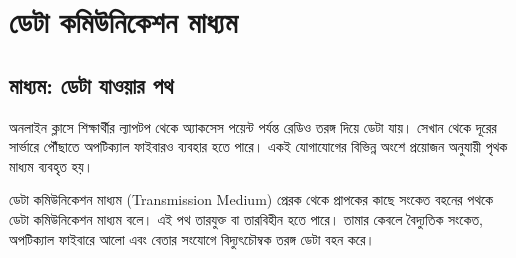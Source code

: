 \begingroup
\chTwoReadableTopicStyle
\section{ডেটা কমিউনিকেশন মাধ্যম}
\subsection{মাধ্যম: ডেটা যাওয়ার পথ}
অনলাইন ক্লাসে শিক্ষার্থীর ল্যাপটপ থেকে অ্যাকসেস পয়েন্ট পর্যন্ত রেডিও তরঙ্গ দিয়ে ডেটা যায়। সেখান থেকে দূরের সার্ভারে পৌঁছাতে অপটিক্যাল ফাইবারও ব্যবহার হতে পারে। একই যোগাযোগের বিভিন্ন অংশে প্রয়োজন অনুযায়ী পৃথক মাধ্যম ব্যবহৃত হয়।
\begin{definitionbox}{ডেটা কমিউনিকেশন মাধ্যম (Transmission Medium)}
প্রেরক থেকে প্রাপকের কাছে সংকেত বহনের পথকে ডেটা কমিউনিকেশন মাধ্যম বলে। এই পথ তারযুক্ত বা তারবিহীন হতে পারে। তামার কেবলে বৈদ্যুতিক সংকেত, অপটিক্যাল ফাইবারে আলো এবং বেতার সংযোগে বিদ্যুৎচৌম্বক তরঙ্গ ডেটা বহন করে।
\end{definitionbox}

